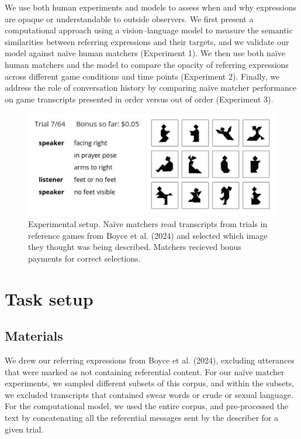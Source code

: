\documentclass[10pt, letterpaper]{article}
\begin{document}
We use both human experiments and models to assess when and why
expressions are opaque or understandable to outside observers. We first
present a computational approach using a vision--language model to
measure the semantic similarities between referring expressions and
their targets, and we validate our model against naïve human matchers
(Experiment 1). We then use both naïve human matchers and the model to
compare the opacity of referring expressions across different game
conditions and time points (Experiment 2). Finally, we address the role
of conversation history by comparing naïve matcher performance on game
transcripts presented in order versus out of order (Experiment 3).

\begin{CodeChunk}
\begin{figure}[t!]

{\centering \includegraphics[width=1\linewidth]{matcher-diagram} 

}

\caption[Experimental setup]{Experimental setup. Naïve matchers read transcripts from trials in reference games from Boyce et al. (2024) and selected which image they thought was being described. Matchers recieved bonus payments for correct selections. \label{game}}\label{fig:interface}
\end{figure}
\end{CodeChunk}

\section{Task setup}\label{task-setup}

\subsection{Materials}\label{materials}

We drew our referring expressions from Boyce et al. (2024), excluding
utterances that were marked as not containing referential content. For
our naïve matcher experiments, we sampled different subsets of this
corpus, and within the subsets, we excluded transcripts that contained
swear words or crude or sexual language. For the computational model, we
used the entire corpus, and pre-processed the text by concatenating all
the referential messages sent by the describer for a given trial.
\end{document}
